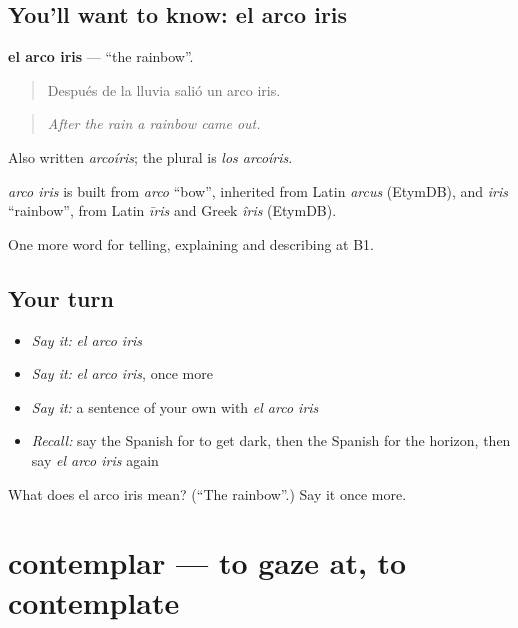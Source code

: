 \subsection*{You'll want to know: el arco iris}
\textbf{el arco iris} — \textquotedblleft{}the rainbow\textquotedblright{}.

\begin{quote}
Después de la lluvia salió un arco iris.
\end{quote}

\begin{quote}
\emph{After the rain a rainbow came out.}
\end{quote}

Also written \emph{arcoíris}; the plural is \emph{los arcoíris}.

\begin{cousinweb}
\emph{arco iris} is built from \emph{arco} \textquotedblleft{}bow\textquotedblright{}, inherited from Latin \emph{arcus} (EtymDB), and \emph{iris} \textquotedblleft{}rainbow\textquotedblright{}, from Latin \emph{īris} and Greek \emph{îris} (EtymDB).
\end{cousinweb}

\begin{grammarlens}[title={What you've built}]
One more word for telling, explaining and describing at B1.
\end{grammarlens}

\subsection*{Your turn}
\begin{itemize}
\raggedright
  \item \emph{Say it:} \emph{el arco iris}
  \item \emph{Say it:} \emph{el arco iris}, once more
  \item \emph{Say it:} a sentence of your own with \emph{el arco iris}
  \item \emph{Recall:} say the Spanish for to get dark, then the Spanish for the horizon, then say \emph{el arco iris} again
\end{itemize}

\begin{tcolorbox}[breakable,colback=teal!4,colframe=teal!35!black,title={Before you move on}]
What does el arco iris mean? (\textquotedblleft{}The rainbow\textquotedblright{}.) Say it once more.
\end{tcolorbox}
\section[contemplar]{contemplar — to gaze at, to contemplate}

